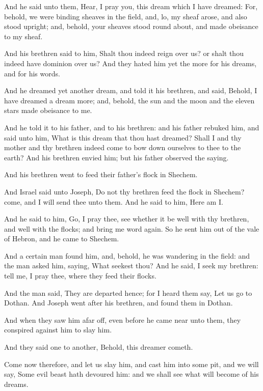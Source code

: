 \verse And he said unto them, Hear, I pray you, this dream which I have
dreamed: \verse For, behold, we were binding sheaves in the field, and,
lo, my sheaf arose, and also stood upright; and, behold, your sheaves
stood round about, and made obeisance to my sheaf.

\verse And his brethren said to him, Shalt thou indeed reign over us? or
shalt thou indeed have dominion over us? And they hated him yet the
more for his dreams, and for his words.

\verse And he dreamed yet another dream, and told it his brethren, and
said, Behold, I have dreamed a dream more; and, behold, the sun and
the moon and the eleven stars made obeisance to me.

\verse And he told it to his father, and to his brethren: and his
father rebuked him, and said unto him, What is this dream that thou
hast dreamed?  Shall I and thy mother and thy brethren indeed come to
bow down ourselves to thee to the earth?  \verse And his brethren
envied him; but his father observed the saying.

\verse And his brethren went to feed their father's flock in Shechem.

\verse And Israel said unto Joseph, Do not thy brethren feed the flock
in Shechem? come, and I will send thee unto them. And he said to him,
Here am I.

\verse And he said to him, Go, I pray thee, see whether it be well with
thy brethren, and well with the flocks; and bring me word again. So he
sent him out of the vale of Hebron, and he came to Shechem.

\verse And a certain man found him, and, behold, he was wandering in
the field: and the man asked him, saying, What seekest thou?  \verse
And he said, I seek my brethren: tell me, I pray thee, where they feed
their flocks.

\verse And the man said, They are departed hence; for I heard them say,
Let us go to Dothan. And Joseph went after his brethren, and found
them in Dothan.

\verse And when they saw him afar off, even before he came near unto
them, they conspired against him to slay him.

\verse And they said one to another, Behold, this dreamer cometh.

\verse Come now therefore, and let us slay him, and cast him into some
pit, and we will say, Some evil beast hath devoured him: and we shall
see what will become of his dreams.

